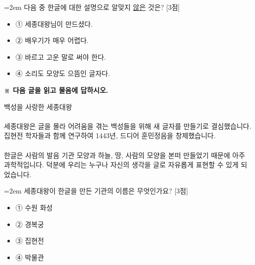 \documentclass[12pt,a4paper]{article}
\newcommand{\qnum}[1]{%
  \tikz[baseline=(num.base)]{%
    \node[circle, fill=numCircle, text=white, inner sep=0pt,
          minimum size=18pt, font=\small\bfseries] (num) {#1};%
  }%
}
\newcommand{\pts}[1]{%
  \hfill\textcolor{ptsBadge}{[#1점]}%
}
\begin{document}
\vspace{4mm}
\begin{samepage}
{\hangindent=2em
\qnum{5}\enspace 다음 중 한글에 대한 설명으로 알맞지 \uline{않은} 것은? \pts{3}
\par}

\vspace{3mm}
\begin{itemize}[leftmargin=2.5em, labelsep=0.3em, label={}, itemsep=4pt, parsep=1pt, topsep=0pt]
  \item ① 세종대왕님이 만드셨다.
  \item ② 배우기가 매우 어렵다.
  \item ③ 바르고 고운 말로 써야 한다.
  \item ④ 소리도 모양도 으뜸인 글자다.
\end{itemize}
\end{samepage}

\vspace{4mm}
{\small\textbf{※ 다음 글을 읽고 물음에 답하시오.}}
\vspace{2mm}
\begin{tcolorbox}[passage]
백성을 사랑한 세종대왕 \\{}
\vspace{4pt} \\{}
세종대왕은 글을 몰라 어려움을 겪는 백성들을 위해 새 글자를 만들기로 결심했습니다. 집현전 학자들과 함께 연구하여 1443년, 드디어 훈민정음을 창제했습니다. \\{}
\vspace{4pt} \\{}
한글은 사람의 발음 기관 모양과 하늘, 땅, 사람의 모양을 본떠 만들었기 때문에 아주 과학적입니다. 덕분에 우리는 누구나 자신의 생각을 글로 자유롭게 표현할 수 있게 되었습니다.
\end{tcolorbox}
\vspace{3mm}
\begin{samepage}
{\hangindent=2em
\qnum{6}\enspace 세종대왕이 한글을 만든 기관의 이름은 무엇인가요? \pts{3}
\par}

\vspace{3mm}
\begin{itemize}[leftmargin=2.5em, labelsep=0.3em, label={}, itemsep=4pt, parsep=1pt, topsep=0pt]
  \item ① 수원 화성
  \item ② 경복궁
  \item ③ 집현전
  \item ④ 박물관
\end{itemize}
\end{samepage}
\end{document}
